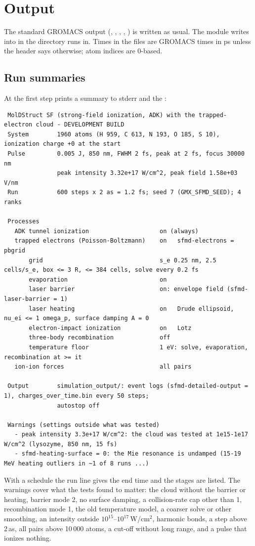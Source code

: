 \chapter{Output}
\label{ch:output}

The standard GROMACS output (, , , , ) is written as usual.
The module writes into  in the directory  runs in.
Times in the files are GROMACS times in ps unless the header says otherwise; atom indices are 0-based.

\section{Run summaries}
\label{sec:summaries}

At the first step  prints a summary to stderr and the :
\begin{lstlisting}
 MolDStruct SF (strong-field ionization, ADK) with the trapped-electron cloud - DEVELOPMENT BUILD
 System        1960 atoms (H 959, C 613, N 193, O 185, S 10), ionization charge +0 at the start
 Pulse         0.005 J, 850 nm, FWHM 2 fs, peak at 2 fs, focus 30000 nm
               peak intensity 3.32e+17 W/cm^2, peak field 1.58e+03 V/nm
 Run           600 steps x 2 as = 1.2 fs; seed 7 (GMX_SFMD_SEED); 4 ranks

 Processes
   ADK tunnel ionization                    on (always)
   trapped electrons (Poisson-Boltzmann)    on   sfmd-electrons = pbgrid
       grid                                 s_e 0.25 nm, 2.5 cells/s_e, box <= 3 R, <= 384 cells, solve every 0.2 fs
       evaporation                          on
       laser barrier                        on: envelope field (sfmd-laser-barrier = 1)
       laser heating                        on   Drude ellipsoid, nu_ei <= 1 omega_p, surface damping A = 0
       electron-impact ionization           on   Lotz
       three-body recombination             off
       temperature floor                    1 eV: solve, evaporation, recombination at >= it
   ion-ion forces                           all pairs

 Output        simulation_output/: event logs (sfmd-detailed-output = 1), charges_over_time.bin every 50 steps;
               autostop off

 Warnings (settings outside what was tested)
   - peak intensity 3.3e+17 W/cm^2: the cloud was tested at 1e15-1e17 W/cm^2 (lysozyme, 850 nm, 15 fs)
   - sfmd-heating-surface = 0: the Mie resonance is undamped (15-19 MeV heating outliers in ~1 of 8 runs ...)
\end{lstlisting}
With a schedule the run line gives the end time and the stages are listed.
The warnings cover what the tests found to matter: the cloud without the barrier or heating, barrier mode 2, no surface
damping, a collision-rate cap other than 1, recombination mode 1, the old temperature model, a coarser solve or other
smoothing, an intensity outside $10^{15}$--$10^{17}$\,W/cm$^2$, harmonic bonds, a step above 2\,as, all pairs above 10\,000
atoms, a cut-off without long range, and a pulse that ionizes nothing.

